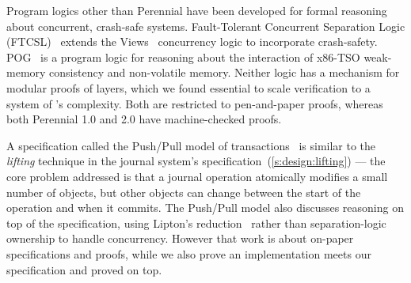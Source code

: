 Program logics other than Perennial
have been developed for formal reasoning about concurrent, crash-safe systems.
Fault-Tolerant Concurrent Separation Logic (FTCSL)~\cite{ntzik:faults} extends
the Views~\cite{dinsdale:views} concurrency logic to incorporate crash-safety.
POG~\cite{raad:pog} is a program logic for reasoning about the interaction of
x86-TSO weak-memory consistency and non-volatile memory.
Neither logic has a mechanism for modular proofs of layers,
which we found essential to scale verification to a system of \txn's
complexity. Both are restricted to pen-and-paper proofs, whereas both Perennial
1.0 and 2.0 have machine-checked proofs.

A specification called the Push/Pull model of
transactions~\cite{koskinen:pushpull} is similar to the \emph{lifting} technique
in the journal system's specification~(\cref{s:design:lifting}) --- the core
problem addressed is that a journal operation atomically modifies a small number
of objects, but other objects can change between the start of the operation and when
it commits. The Push/Pull model also discusses reasoning on top of the
specification, using Lipton's reduction~\cite{lipton:movers} rather than
separation-logic ownership to handle concurrency. However that work is about
on-paper specifications and proofs, while we also prove an implementation meets
our specification and proved \simplenfs on top.
